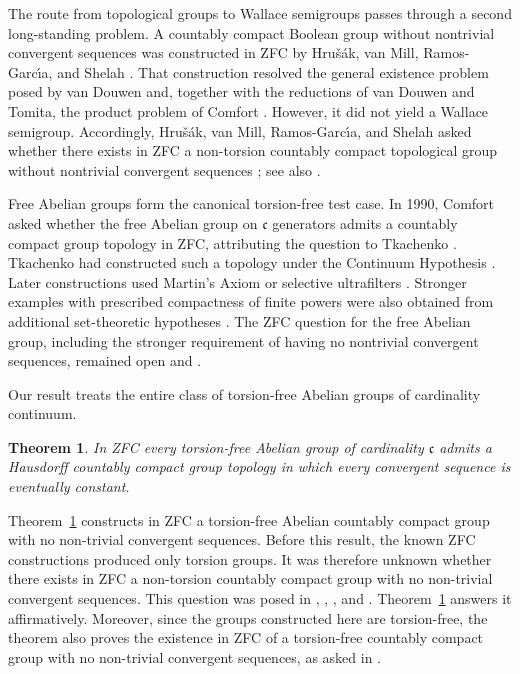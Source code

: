 \documentclass[11pt]{amsart}
\newtheorem{theorem}{Theorem}[section]
\theoremstyle{definition}
\newcommand{\cfrak}{\mathfrak c}
\begin{document}
The route from topological groups to Wallace semigroups passes through a
second long-standing problem.  A countably compact Boolean group without
nontrivial convergent sequences was constructed in ZFC by Hru\v{s}\'ak, van Mill,
Ramos-Garc\'{\i}a, and Shelah \cite{HrusakVanMillRamosShelah2021}.
That construction resolved the general existence problem posed by van Douwen
and, together with the reductions of van Douwen and Tomita, the product problem
of Comfort \cite{vanDouwen1980,Tomita2005Square}.
However, it did not yield a Wallace semigroup.  Accordingly, Hru\v{s}\'ak,
van Mill, Ramos-Garc\'{\i}a, and Shelah asked whether
there exists in ZFC a non-torsion countably compact topological group without
nontrivial convergent sequences
\cite[Questions~5.5 and~5.6]{HrusakVanMillRamosShelah2021}; see also
\cite[Questions~19 and~20]{HrusakShibakov2021}.

Free Abelian groups form the canonical torsion-free test case.  In 1990,
Comfort asked whether the free Abelian group on $\cfrak$ generators admits a
countably compact group topology in ZFC, attributing the question to Tkachenko
\cite[Question~3C.1]{Comfort1990}.  Tkachenko had constructed such a topology
under the Continuum Hypothesis \cite{Tkachenko1990}.  Later constructions used
Martin's Axiom or selective ultrafilters
\cite{KoszmiderTomitaWatson2000,MadariagaGarciaTomita2007,
BoeroPereiraTomita2019}.  Stronger examples with prescribed compactness of
finite powers were also obtained from additional set-theoretic hypotheses
\cite{BelliniHartRodriguesTomita2023,FuentesMaguinaRodriguesTomita2024}.
The ZFC question for the free Abelian group, including the stronger requirement
of having no nontrivial convergent sequences, remained open
\cite[Problem~6.2]{BelliniRodriguesTomita2021Forcing} and
\cite[Question~6.2]{BelliniHartRodriguesTomita2023}.

Our result treats the entire class of
torsion-free Abelian groups of cardinality continuum.

\begin{theorem}\label{thm:main}
In ZFC every torsion-free Abelian group of cardinality $\cfrak$ admits a
Hausdorff countably compact group topology in which every convergent sequence
is eventually constant.
\end{theorem}

Theorem~\ref{thm:main} constructs in
ZFC a torsion-free Abelian countably compact group with no
non-trivial convergent sequences. Before this result, the known
ZFC constructions produced only torsion groups. It was therefore
unknown whether there exists in ZFC a non-torsion countably
compact group with no non-trivial convergent sequences. This question was
posed in \cite[Question~6(a)]{Tomita2019SmallPowers},
\cite[Question~20]{HrusakShibakov2021},
\cite[Question~5.6]{HrusakVanMillRamosShelah2021}, and
\cite[Question~6.8]{TomitaTrianonFraga2022}.
Theorem~\ref{thm:main} answers it affirmatively. Moreover, since the groups
constructed here are torsion-free, the theorem also proves the existence in
ZFC of a torsion-free countably compact group with no non-trivial
convergent sequences, as asked in
\cite[Problem~1.2]{BelliniRodriguesTomita2021Forcing}.
\end{document}
